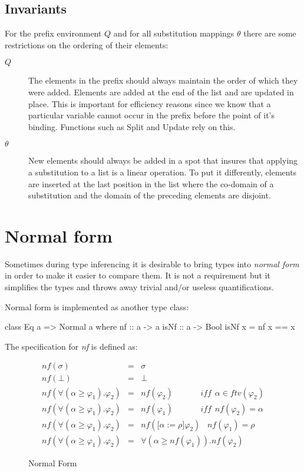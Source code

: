 \subsection{Invariants}
For the prefix environment $Q$ and for all substitution mappings $\theta$ there are some restrictions on the ordering of their elements:
\begin{description}
\item[\textbf{$Q$}] The elements in the prefix should always maintain the order of which they were added. Elements are added at the end of the list and are updated in place. This is important for efficiency reasons since we know that a particular variable cannot occur in the prefix before the point of it's binding. Functions such as Split and Update rely on this.
\item[\textbf{$\theta$}] New elements should always be added in a spot that insures that applying a substitution to a list is a linear operation. To put it differently, elements are inserted at the last position in the list where the co-domain of a substitution and the domain of the preceding elements are disjoint.
\end{description}
\section{Normal form}
Sometimes during type inferencing it is desirable to bring types into \emph{normal form} in order to make it easier to compare them. It is not a requirement but it simplifies the types and throws away trivial and/or useless quantifications.

Normal form is implemented as another type class:

\begin{code}
class Eq a => Normal a where
  nf :: a -> a
  isNf :: a -> Bool
  isNf x = nf x == x
\end{code}

The specification for \emph{nf} is defined as:

\begin{figure}[H]
\begin{eqnarray*}
nf(\sigma) & = & \sigma \\
nf(\bot) & = & \bot \\
nf(\forall(\alpha \geq \varphi_1).\varphi_2) & = & nf(\varphi_2) \hspace{40pt} iff \hspace{5pt} \alpha \in ftv (\varphi_2) \\
nf(\forall(\alpha \geq \varphi_1).\varphi_2) & = & nf(\varphi_1) \hspace{40pt} iff \hspace{5pt} nf (\varphi_2) = \alpha \\
nf(\forall(\alpha \geq \varphi_1).\varphi_2) & = & nf(\lbrack \alpha := \rho \rbrack\varphi_2) \hspace{10pt} nf(\varphi_1)=\rho \\
nf(\forall(\alpha \geq \varphi_1).\varphi_2) & = & \forall(\alpha \geq nf(\varphi_1)).nf(\varphi_2)
\end{eqnarray*}
\caption{Normal Form}
\end{figure}

